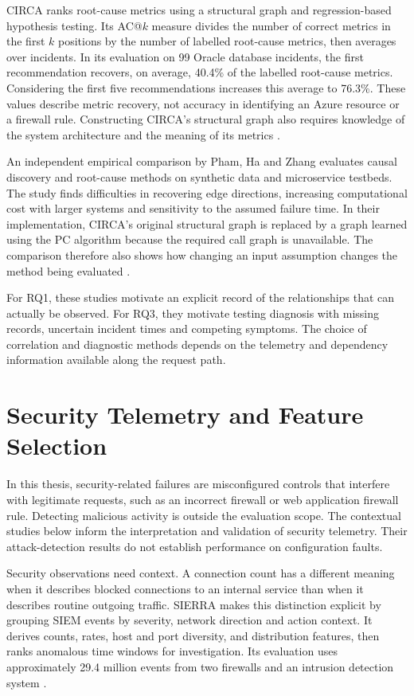 CIRCA ranks root-cause metrics using a structural graph and regression-based
hypothesis testing. Its AC@$k$ measure divides the number of correct metrics
in the first $k$ positions by the number of labelled root-cause metrics,
then averages over incidents. In its evaluation on 99 Oracle database
incidents, the first recommendation recovers, on average, 40.4\% of the
labelled root-cause metrics. Considering the first five recommendations
increases this average to 76.3\%. These values describe metric recovery,
not accuracy in identifying an Azure resource or a firewall rule.
Constructing CIRCA's structural graph also requires knowledge of the system
architecture and the meaning of its metrics
\parencite[Sections~5.1--5.4, Table~3]{li2022circa}.

An independent empirical comparison by Pham, Ha and Zhang evaluates
causal discovery and root-cause methods on synthetic data and microservice
testbeds. The study finds difficulties in
recovering edge directions, increasing computational cost with larger
systems and sensitivity to the assumed failure time. In their implementation,
CIRCA's original structural graph is replaced by a graph learned using the
PC algorithm because the required call graph is unavailable. The comparison
therefore also shows how changing an input assumption changes the method
being evaluated \parencite[Sections~3--5]{pham2024howfar}.

For RQ1, these studies motivate an explicit record of the relationships
that can actually be observed. For RQ3, they motivate testing diagnosis with
missing records, uncertain incident times and competing symptoms.
The choice of correlation and diagnostic methods depends
on the telemetry and dependency information available along the request path.

\section{Security Telemetry and Feature Selection}
\label{sec:state-of-the-art:security}

In this thesis, security-related failures are misconfigured controls that
interfere with legitimate requests, such as an incorrect firewall or web
application firewall rule. Detecting malicious activity is outside the
evaluation scope. The contextual studies below inform the interpretation
and validation of security telemetry. Their attack-detection results do
not establish performance on configuration faults.

Security observations need context. A connection count has a different
meaning when it describes blocked connections to an internal service than
when it describes routine outgoing traffic. SIERRA makes this distinction
explicit by grouping SIEM events by severity, network direction and action
context. It derives counts, rates, host and port diversity, and distribution
features, then ranks anomalous time windows for investigation. Its evaluation
uses approximately 29.4 million events from two firewalls and an intrusion
detection system \parencite[Sections~4--7]{lee2022sierra}.

